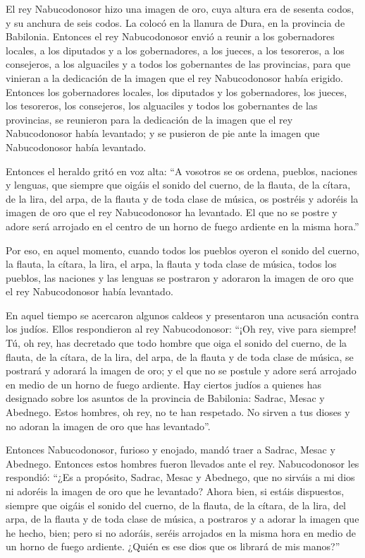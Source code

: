  El rey Nabucodonosor hizo una imagen de oro, cuya altura
era de sesenta codos, y su anchura de seis codos. La colocó en la
llanura de Dura, en la provincia de Babilonia.  Entonces
el rey Nabucodonosor envió a reunir a los gobernadores locales, a los
diputados y a los gobernadores, a los jueces, a los tesoreros, a los
consejeros, a los alguaciles y a todos los gobernantes de las
provincias, para que vinieran a la dedicación de la imagen que el rey
Nabucodonosor había erigido.  Entonces los gobernadores
locales, los diputados y los gobernadores, los jueces, los tesoreros,
los consejeros, los alguaciles y todos los gobernantes de las
provincias, se reunieron para la dedicación de la imagen que el rey
Nabucodonosor había levantado; y se pusieron de pie ante la imagen que
Nabucodonosor había levantado.

 Entonces el heraldo gritó en voz alta: ``A vosotros se os
ordena, pueblos, naciones y lenguas,  que siempre que
oigáis el sonido del cuerno, de la flauta, de la cítara, de la lira, del
arpa, de la flauta y de toda clase de música, os postréis y adoréis la
imagen de oro que el rey Nabucodonosor ha levantado.  El
que no se postre y adore será arrojado en el centro de un horno de fuego
ardiente en la misma hora.''

 Por eso, en aquel momento, cuando todos los pueblos
oyeron el sonido del cuerno, la flauta, la cítara, la lira, el arpa, la
flauta y toda clase de música, todos los pueblos, las naciones y las
lenguas se postraron y adoraron la imagen de oro que el rey
Nabucodonosor había levantado.

 En aquel tiempo se acercaron algunos caldeos y
presentaron una acusación contra los judíos.  Ellos
respondieron al rey Nabucodonosor: ``¡Oh rey, vive para siempre!
 Tú, oh rey, has decretado que todo hombre que oiga el
sonido del cuerno, de la flauta, de la cítara, de la lira, del arpa, de
la flauta y de toda clase de música, se postrará y adorará la imagen de
oro;  y el que no se postule y adore será arrojado en
medio de un horno de fuego ardiente.  Hay ciertos judíos
a quienes has designado sobre los asuntos de la provincia de Babilonia:
Sadrac, Mesac y Abednego. Estos hombres, oh rey, no te han respetado. No
sirven a tus dioses y no adoran la imagen de oro que has levantado''.

 Entonces Nabucodonosor, furioso y enojado, mandó traer a
Sadrac, Mesac y Abednego. Entonces estos hombres fueron llevados ante el
rey.  Nabucodonosor les respondió: ``¿Es a propósito,
Sadrac, Mesac y Abednego, que no sirváis a mi dios ni adoréis la imagen
de oro que he levantado?  Ahora bien, si estáis
dispuestos, siempre que oigáis el sonido del cuerno, de la flauta, de la
cítara, de la lira, del arpa, de la flauta y de toda clase de música, a
postraros y a adorar la imagen que he hecho, bien; pero si no adoráis,
seréis arrojados en la misma hora en medio de un horno de fuego
ardiente. ¿Quién es ese dios que os librará de mis manos?''

